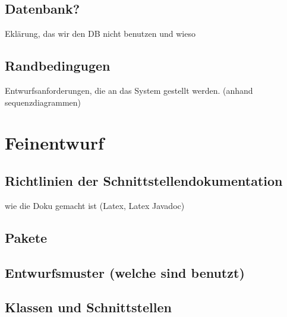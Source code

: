 \documentclass[parskip=full,11pt,twoside]{scrartcl}
\begin{document}
\subsection{Datenbank?}
Eklärung, das wir den DB nicht benutzen und wieso
\subsection{Randbedingugen}
Entwurfsanforderungen, die an das System gestellt werden. (anhand sequenzdiagrammen)
\pagebreak

\section{Feinentwurf}
\subsection{Richtlinien der Schnittstellendokumentation}
wie die Doku gemacht ist (Latex, Latex Javadoc)
\subsection{Pakete}
\subsection{Entwurfsmuster (welche sind benutzt)}
\subsection{Klassen und Schnittstellen}
\pagebreak
\end{document}
